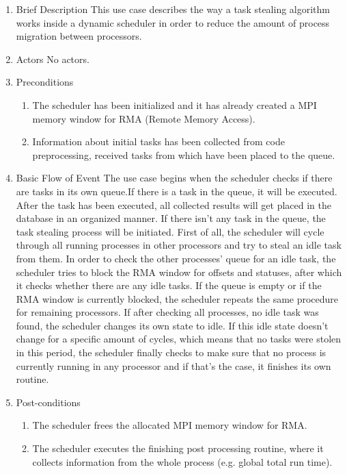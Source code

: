 \begin{enumerate}[1. ]


	\item Brief Description
	\newline
	This use case describes the way a task stealing algorithm works inside a dynamic scheduler in order to reduce the amount of process migration between processors.
	
	\item Actors
	\newline
	No actors. 
	
	
	\item Preconditions
	\begin{enumerate}
	\item The scheduler has been initialized and it has already created a MPI memory window for RMA (Remote Memory Access).
	\item Information about initial tasks has been collected from code preprocessing, received tasks from which have been placed to the queue.
	\end{enumerate}
	
	\item Basic Flow of Event
	\newline
	The use case begins when the scheduler checks if there are tasks in its own queue.If there is a task in the queue, it will be executed. After the task has been executed, all collected results will get placed in the database in an organized manner.
	If there isn't any task in the queue, the task stealing process will be initiated. First of all, the scheduler will cycle through all running processes in other processors and try to steal an idle task from them. In order to check the other processes' queue for an idle task, the scheduler tries to block the RMA window for offsets and statuses, after which it checks whether there are any idle tasks. If the queue is empty or if the RMA window is currently blocked, the scheduler repeats the same procedure for remaining processors. If after checking all processes, no idle task was found, the scheduler changes its own state to idle. If this idle state doesn't change for a specific amount of cycles, which means that no tasks were stolen in this period, the scheduler finally checks to make sure that no process is currently running in any processor and if that's the case, it finishes its own routine. 
	
	
	\item Post-conditions
	\begin{enumerate}
	\item The scheduler frees the allocated MPI memory window for RMA.
	\item The scheduler executes the finishing post processing routine, where it collects information from the whole process (e.g. global total run time).
	\end{enumerate}
	

\end{enumerate}
